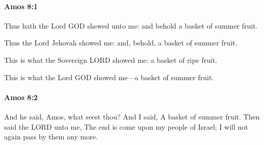 		\paragraph{Amos 8:1} %
			\label{AMOS-8-1}

			Thus hath the Lord GOD shewed unto me: and behold a basket of summer fruit.

			\begin{versebox}
					\item[BHS] 
					\item[LXX] 
					\item[ASV] Thus the Lord Jehovah showed me: and, behold, a basket of summer fruit.
					\item[NIV] This is what the Sovereign LORD showed me: a basket of ripe fruit.
					\item[NRSV] This is what the Lord GOD showed me—a basket of summer fruit.
			\end{versebox}

		\paragraph{Amos 8:2} %
			\label{AMOS-8-2}

			And he said, Amos, what seest thou? And I said, A basket of summer fruit. Then said the LORD unto me, The end is come upon my people of Israel; I will not again pass by them any more.

